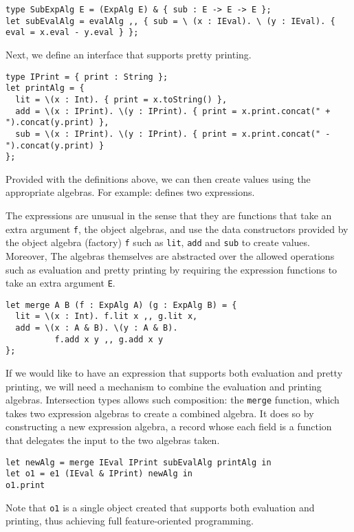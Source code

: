 \begin{lstlisting}
type SubExpAlg E = (ExpAlg E) & { sub : E -> E -> E };
let subEvalAlg = evalAlg ,, { sub = \ (x : IEval). \ (y : IEval). { eval = x.eval - y.eval } };
\end{lstlisting}

Next, we define an interface that supports pretty printing.

\begin{lstlisting}
type IPrint = { print : String };
let printAlg = {
  lit = \(x : Int). { print = x.toString() },
  add = \(x : IPrint). \(y : IPrint). { print = x.print.concat(" + ").concat(y.print) },
  sub = \(x : IPrint). \(y : IPrint). { print = x.print.concat(" - ").concat(y.print) }
};
\end{lstlisting}

Provided with the definitions above, we can then create values using the
appropriate algebras. For example:
defines two expressions.

The expressions are unusual in the sense that they are functions that take an
extra argument \lstinline{f}, the object algebras, and use the data constructors
provided by the object algebra (factory) \lstinline{f} such as \lstinline{lit},
\lstinline{add} and \lstinline{sub} to create values. Moreover, The algebras
themselves are abstracted over the allowed operations such as evaluation and
pretty printing by requiring the expression functions to take an extra argument
\lstinline{E}.

\begin{lstlisting}
let merge A B (f : ExpAlg A) (g : ExpAlg B) = {
  lit = \(x : Int). f.lit x ,, g.lit x,
  add = \(x : A & B). \(y : A & B).
          f.add x y ,, g.add x y
};
\end{lstlisting}

If we would like to have an expression that supports both evaluation and pretty
printing, we will need a mechanism to combine the evaluation and printing
algebras. Intersection types allows such composition: the \lstinline{merge}
function, which takes two expression algebras to create a combined algebra. It
does so by constructing a new expression algebra, a record whose each field is a
function that delegates the input to the two algebras taken.
\begin{lstlisting}
let newAlg = merge IEval IPrint subEvalAlg printAlg in
let o1 = e1 (IEval & IPrint) newAlg in
o1.print
\end{lstlisting}
Note that \lstinline{o1} is a single object created that supports both
evaluation and printing, thus achieving full feature-oriented programming.

